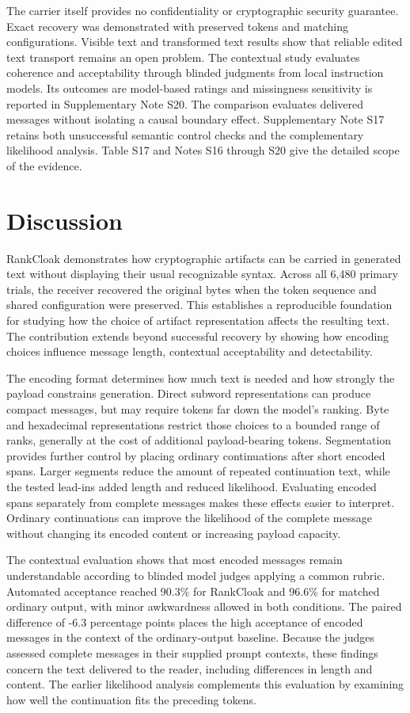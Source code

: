 \documentclass[fleqn,10pt]{wlscirep}
\begin{document}
The carrier itself provides no confidentiality or cryptographic security guarantee. Exact recovery was demonstrated with preserved tokens and matching configurations. Visible text and transformed text results show that reliable edited text transport remains an open problem. 
The contextual study evaluates coherence and acceptability through blinded judgments from local instruction models. Its outcomes are model-based ratings and missingness sensitivity is reported in Supplementary Note S20. The comparison evaluates delivered messages without isolating a causal boundary effect. Supplementary Note S17 retains both unsuccessful semantic control checks and the complementary likelihood analysis. Table S17 and Notes S16 through S20 give the detailed scope of the evidence.


\section*{Discussion}\label{sec:discussion}

RankCloak demonstrates how cryptographic artifacts can be carried in generated text without displaying their usual recognizable syntax. Across all 6,480 primary trials, the receiver recovered the original bytes when the token sequence and shared configuration were preserved. This establishes a reproducible foundation for studying how the choice of artifact representation affects the resulting text. The contribution extends beyond successful recovery by showing how encoding choices influence message length, contextual acceptability and detectability.

The encoding format determines how much text is needed and how strongly the payload constrains generation. Direct subword representations can produce compact messages, but may require tokens far down the model's ranking. Byte and hexadecimal representations restrict those choices to a bounded range of ranks, generally at the cost of additional payload-bearing tokens. Segmentation provides further control by placing ordinary continuations after short encoded spans. Larger segments reduce the amount of repeated continuation text, while the tested lead-ins added length and reduced likelihood. Evaluating encoded spans separately from complete messages makes these effects easier to interpret. Ordinary continuations can improve the likelihood of the complete message without changing its encoded content or increasing payload capacity.

The contextual evaluation shows that most encoded messages remain understandable according to blinded model judges applying a common rubric. Automated acceptance reached 90.3\% for RankCloak and 96.6\% for matched ordinary output, with minor awkwardness allowed in both conditions. The paired difference of -6.3 percentage points places the high acceptance of encoded messages in the context of the ordinary-output baseline. Because the judges assessed complete messages in their supplied prompt contexts, these findings concern the text delivered to the reader, including differences in length and content. The earlier likelihood analysis complements this evaluation by examining how well the continuation fits the preceding tokens.
\end{document}
